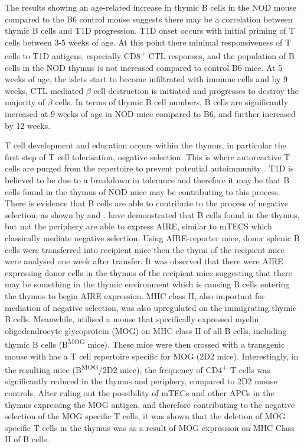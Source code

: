 The results showing an age-related increase in thymic B cells in the NOD mouse compared to the B6 control mouse suggests there may be a correlation between thymic B cells and T1D progression.
T1D onset occurs with initial priming of T cells between 3-5 weeks of age. 
At this point there minimal responsiveness of T cells to T1D antigens, especially CD8\textsuperscript{+} CTL responses, and the population of B cells in the NOD thymus is not increased compared to control B6 mice.
At 5 weeks of age, the islets start to become infiltrated with immune cells and by 9 weeks, CTL mediated $\beta$ cell destruction is initiated and progresses to destroy the majority of $\beta$ cells.
In terms of thymic B cell numbers, B cells are significantly increased at 9 weeks of age in NOD mice compared to B6, and further increased by 12 weeks.


T cell development and education occurs within the thymus, in particular the first step of T cell tolerisation, negative selection.
This is where autoreactive T cells are purged from the repertoire to prevent potential autoimmunity \citep{Hogquist2005}.
T1D is believed to be due to a breakdown in tolerance and therefore it may be that B cells found in the thymus of NOD mice may be contributing to this process.
There is evidence that B cells are able to contribute to the process of negative selection, as shown by \citet{Frommer2010} and \citet{Yamano2015}.
\citet{Yamano2015} have demonstrated that B cells found in the thymus, but not the periphery are able to express AIRE, similar to mTECS which classically mediate negative selection.
Using AIRE-reporter mice, donor splenic B cells were transferred into recipient mice then the thymi of the recipient mice were analysed one week after transfer.
It was observed that there were AIRE expressing donor cells in the thymus of the recipient mice suggesting that there may be something in the thymic environment which is causing B cells entering the thymus to begin AIRE expression.
MHC class II, also important for mediation of negative selection, was also upregulated on the immigrating thymic B cells.
Meanwhile, \citet{Frommer2010} utilised a mouse that specifically expressed myelin oligodendrocyte glycoprotein (MOG) on MHC class II of all B cells, including thymic B cells (B\textsuperscript{MOG} mice). 
These mice were then crossed with a transgenic mouse with has a T cell repertoire specific for MOG (2D2 mice).
Interestingly, in the resulting mice (B\textsuperscript{MOG}/2D2 mice), the frequency of CD4\textsuperscript{+} T cells was significantly reduced in the thymus and periphery, compared to 2D2 mouse controls.
After ruling out the possibility of mTECs and other APCs in the thymus expressing the MOG antigen, and therefore contributing to the negative selection of the MOG specific T cells, it was shown that the deletion of MOG specific T cells in the thymus was as a result of MOG expression on MHC Class II of B cells. 

